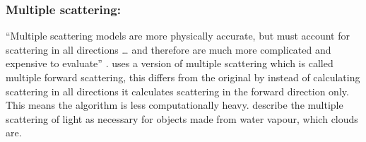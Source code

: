 \subsubsection{Multiple scattering:}
\label{sec:multiple}
“Multiple scattering models are more physically accurate, but must account for scattering in all directions … and therefore are much more complicated and expensive to evaluate” \citep{MHarris01}.
\citet{HarrisEtAl03} uses a version of multiple scattering which is called multiple forward scattering, this differs from the original by instead of calculating scattering in all directions it calculates scattering in the forward direction only.
This means the algorithm is less computationally heavy. \citet*{Fedkiw01} describe the multiple scattering of light as necessary for objects made from water vapour, which clouds are.
